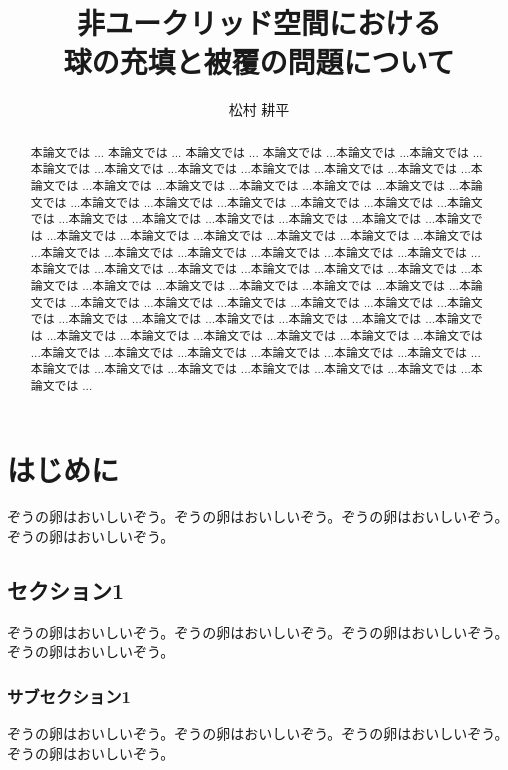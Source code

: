 \documentclass[12pt, xelatex,ja=standard,jafont=noto]{bxjsreport}
\affiliation{立命館大学大学院 情報理工学研究科} %
\title{非ユークリッド空間における\\球の充填と被覆の問題について} %
\author{松村 耕平} %
\begin{document}
\maketitle
\begin{abstract}
本論文では ...
本論文では ...
本論文では ...
本論文では ...本論文では ...本論文では ...本論文では ...本論文では ...本論文では ...本論文では ...本論文では ...本論文では ...本論文では ...本論文では ...本論文では ...本論文では ...本論文では ...本論文では ...本論文では ...本論文では ...本論文では ...本論文では ...本論文では ...本論文では ...本論文では ...本論文では ...本論文では ...本論文では ...本論文では ...本論文では ...本論文では ...本論文では ...本論文では ...本論文では ...本論文では ...本論文では ...本論文では ...本論文では ...本論文では ...本論文では ...本論文では ...本論文では ...本論文では ...本論文では ...本論文では ...本論文では ...本論文では ...本論文では ...本論文では ...本論文では ...本論文では ...本論文では ...本論文では ...本論文では ...本論文では ...本論文では ...本論文では ...本論文では ...本論文では ...本論文では ...本論文では ...本論文では ...本論文では ...本論文では ...本論文では ...本論文では ...本論文では ...本論文では ...本論文では ...本論文では ...本論文では ...本論文では ...本論文では ...本論文では ...本論文では ...本論文では ...本論文では ...本論文では ...本論文では ...本論文では ...本論文では ...本論文では ...本論文では ...本論文では ...本論文では ...本論文では ...本論文では ...
\end{abstract}


\tableofcontents


\chapter{はじめに}
ぞうの卵はおいしいぞう。ぞうの卵はおいしいぞう。ぞうの卵はおいしいぞう。ぞうの卵はおいしいぞう。
\section{セクション1}
ぞうの卵はおいしいぞう。ぞうの卵はおいしいぞう。ぞうの卵はおいしいぞう。ぞうの卵はおいしいぞう。
\subsection{サブセクション1}
ぞうの卵はおいしいぞう。ぞうの卵はおいしいぞう。ぞうの卵はおいしいぞう。ぞうの卵はおいしいぞう。
\end{document}

